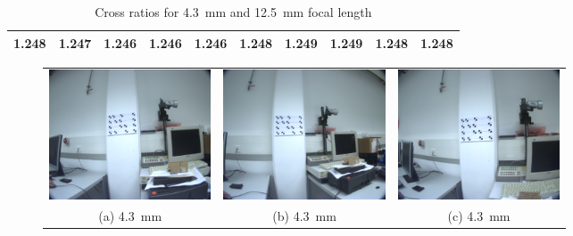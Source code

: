 \documentclass[
a4paper,     %
12pt         %
]{scrartcl}  %
\begin{document}
\begin{table}[ht!]
  \centering
  \begin{tabular}{|c|c|c|c|c||c|c|c|c|c|}\hline
    1.248 & 1.247 & 1.246 & 1.246 & 1.246 & 1.248 & 1.249 & 1.249 & 1.248 & 1.248\\\hline
  \end{tabular}
  \caption{Cross ratios for \SI{4.3}{mm} and \SI{12.5}{mm} focal length}
  \label{tab:cross_ratios}
\end{table}


\begin{figure}[ht!]
\centering
\begin{tabular}{ccc}
 \includegraphics[width=48mm]{./Bildg_Messtechnik_Lab/CrossRatio/images/image_a1.png} & \includegraphics[width=48mm]{./Bildg_Messtechnik_Lab/CrossRatio/images/image_a2.png} & \includegraphics[width=48mm]{./Bildg_Messtechnik_Lab/CrossRatio/images/image_a3.png}\\
(a) \SI{4.3}{mm} & (b) \SI{4.3}{mm} & (c) \SI{4.3}{mm}\\[6pt]

\end{tabular}
\end{figure}
\end{document}
